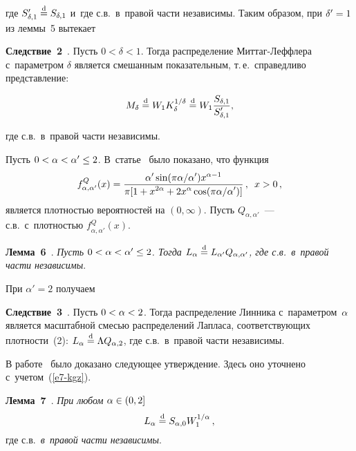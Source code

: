 \begin{multicols}{2}
\vspace*{-1pt}

\noindent
где $S'_{\delta,1}\stackrel{\mathrm{d}}{=} S_{\delta,1}$ и~где с.в.\ в~правой части
независимы. Таким образом, при $\delta'\hm=1$ из леммы~5 вытекает

\smallskip

\noindent
\textbf{Следствие~2}~\cite{Kozubowski1998, KorolevZeifmanKMJ}. 
Пусть $0<\delta<1$. Тогда распределение Миттаг-Леффлера с~параметром
$\delta$ является смешанным показательным, т.\,е.\ справедливо представление:

\noindent
$$
M_{\delta}\stackrel{\mathrm{d}}{=} W_1 K_{\delta}^{1/\delta}\stackrel{\mathrm{d}}{=}
W_1 \displaystyle\frac{\displaystyle S_{\delta,1}\mathstrut}{\displaystyle S'_{\delta,1}\mathstrut},
$$

\vspace*{-2pt}

\noindent
где с.в.\ в~правой части независимы.

\smallskip

Пусть $0<\alpha\hm<\alpha'\hm\le2$. В~статье~\cite{KotzOstrovskii1996}
было показано, что функция
$$
f_{\alpha,\alpha'}^{Q}(x)= \displaystyle\frac{\displaystyle \alpha'\sin(\pi\alpha/\alpha')
x^{\alpha-1}\mathstrut}{\displaystyle \pi[1+x^{2\alpha}+2x^{\alpha}\cos(\pi\alpha/\alpha')]\mathstrut}\,,\enskip
 x>0\,,
$$
является плотностью вероятностей на $(0,\infty)$. Пусть
$Q_{\alpha,\alpha'}$~--- с.в.\ с~плот\-ностью
$f_{\alpha,\alpha'}^{Q}(x)$.

\smallskip

\noindent
\textbf{Лемма~6}~\cite{KotzOstrovskii1996}. \textit{Пусть
$0\hm<\alpha\hm<\alpha'\hm\le2$. Тогда $L_{\alpha}\hm\eqd
L_{\alpha'}Q_{\alpha,\alpha'}$, где с.в.\ в~правой части
независимы}.

\smallskip

При $\alpha'=2$ получаем

\smallskip

\noindent
\textbf{Следствие~3}~\cite{KotzOstrovskii1996}. Пусть
$0\hm<\alpha\hm<2$. Тогда распределение Линника с~параметром~$\alpha$
является масштабной смесью распределений Лапласа, соответствующих
плотности~(2): $L_{\alpha}\hm\eqd \Lambda Q_{\alpha,2}$, где с.в.\ 
в~правой части независимы.

\smallskip

В работе~\cite{Devroye1990} было доказано следующее утверждение.
Здесь оно уточнено с~учетом~(\ref{e7-kgz}).

\smallskip

\noindent
\textbf{Лемма~7}~\cite{Devroye1990}. \textit{При любом} $\alpha\hm\in(0,2]$
$$
L_{\alpha}\stackrel{\mathrm{d}}{=} S_{\alpha,0} W_1^{1/\alpha}\,,
$$ 
где с.в.\  \textit{в~правой части независимы}.


\end{multicols}
